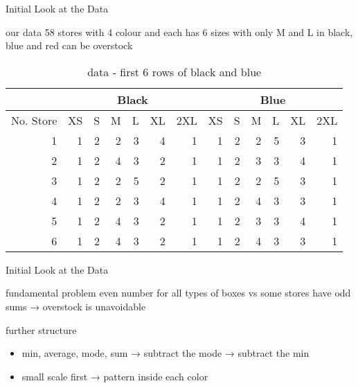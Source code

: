 \begin{frame}{Initial Look at the Data}
\begin{block}{our data}
	58 stores with 4 colour and each has 6 sizes with only M and L in black, blue and red can be overstock 
\end{block}
\begin{table}[htbp]
	\begin{center}
		\begin{tabular}{|r|r|r|r|r|r|r|r|r|r|r|r|r|}
			\hline
			\multicolumn{1}{|l|}{} & \multicolumn{6}{c|}{Black} &  \multicolumn{6}{c|}{Blue} \\ \hline
			\multicolumn{1}{|l|}{No. Store} & \multicolumn{1}{l|}{XS} & \multicolumn{1}{l|}{S} & \multicolumn{1}{l|}{M} & \multicolumn{1}{l|}{L} & \multicolumn{1}{l|}{XL} & \multicolumn{1}{l|}{2XL} & \multicolumn{1}{l|}{XS} & \multicolumn{1}{l|}{S} & \multicolumn{1}{l|}{M} & \multicolumn{1}{l|}{L} & \multicolumn{1}{l|}{XL} & \multicolumn{1}{l|}{2XL} \\ \hline
			1 & 1 & 2 & 2 & 3 & 4 & 1 & 1 & 2 & 2 & 5 & 3 & 1 \\ \hline
			2 & 1 & 2 & 4 & 3 & 2 & 1 & 1 & 2 & 3 & 3 & 4 & 1 \\ \hline
			3 & 1 & 2 & 2 & 5 & 2 & 1 & 1 & 2 & 2 & 5 & 3 & 1 \\ \hline
			4 & 1 & 2 & 2 & 3 & 4 & 1 & 1 & 2 & 4 & 3 & 3 & 1 \\ \hline
			5 & 1 & 2 & 4 & 3 & 2 & 1 & 1 & 2 & 3 & 3 & 4 & 1 \\ \hline
			6 & 1 & 2 & 4 & 3 & 2 & 1 & 1 & 2 & 4 & 3 & 3 & 1 \\ \hline
		\end{tabular}
	\end{center}
	\caption{data - first 6 rows of black and blue}
	\label{}
\end{table}
\end{frame}

\begin{frame}{Initial Look at the Data}
 \begin{block}{fundamental problem} 
	even number for all types of boxes vs some stores have odd sums → overstock is unavoidable
\end{block}
\begin{block}{further structure}
	\begin{itemize}
		\item min, average, mode, sum → subtract the mode → subtract the min 
		\item small scale first → pattern inside each color
	\end{itemize}
\end{block}
\end{frame}

